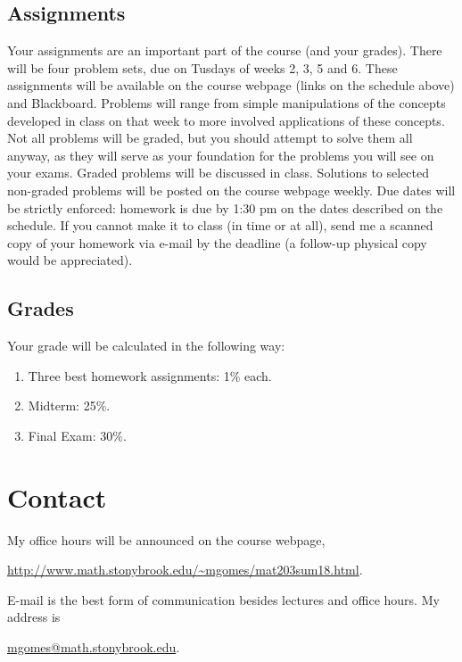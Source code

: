 \documentclass[11pt]{amsart}
\numberwithin{equation}{section}
\begin{document}
\subsection{Assignments}
Your assignments are an important part of the course (and your grades). There will be four problem sets, due on Tusdays of weeks 2, 3, 5 and 6. These assignments will be available on the course webpage (links on the schedule above) and Blackboard. 
    Problems will range from simple manipulations of the concepts developed in class on that week to more involved applications of these concepts. 
    Not all problems will be graded, but you should attempt to solve them all anyway, as they will serve as your foundation for the problems you will see on your exams. Graded problems will be discussed in class. Solutions to selected non-graded problems will be posted on the course webpage weekly.  
   Due dates will be strictly enforced: homework is due by 1:30 pm on the dates described on the schedule. If you cannot make it to class (in time or at all), send me a scanned copy of your homework via e-mail by the deadline (a follow-up physical copy would be appreciated).

\subsection{Grades}
Your grade will be calculated in the following way:
\begin{enumerate}
\item Three best homework assignments: 1$\%$ each.
\item Midterm: 25$\%$.
\item Final Exam: 30$\%$.
\end{enumerate}

\section{Contact}
My office hours will be announced on the course webpage, 
\begin{center}
\url{http://www.math.stonybrook.edu/~mgomes/mat203sum18.html}.
\end{center}
E-mail is the best form of communication besides lectures and office hours. My address is 
\begin{center}
\href{mailto: mgomes@math.stonybrook.edu}{ mgomes@math.stonybrook.edu}.
\end{center}
\end{document}
